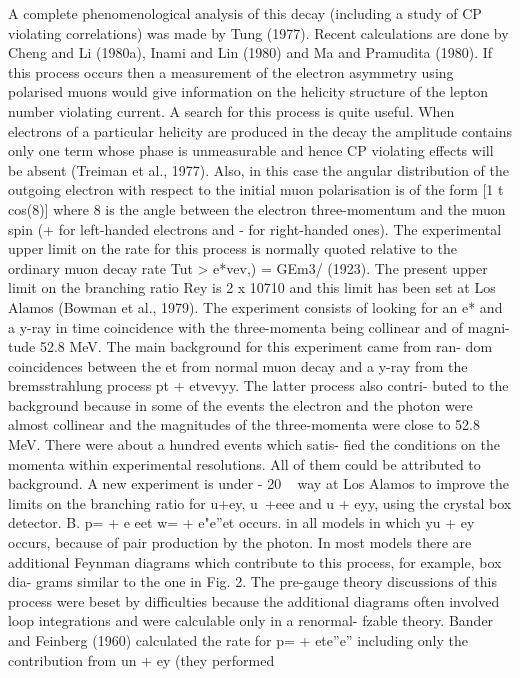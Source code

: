 \documentclass[twoside]{article}
\begin{document}
{{{{{{A complete phenomenological analysis of this decay (including a study of
CP violating correlations) was made by Tung (1977). Recent calculations
are done by Cheng and Li (1980a), Inami and Lin (1980) and Ma and
Pramudita (1980). If this process occurs then a measurement of the
electron asymmetry using polarised muons would give information on the
helicity structure of the lepton number violating current. A search for
this process is quite useful. When electrons of a particular helicity
are produced in the decay the amplitude contains only one term whose
phase is unmeasurable and hence CP violating effects will be absent
(Treiman et al., 1977). Also, in this case the angular distribution of
the outgoing electron with respect to the initial muon polarisation is
of the form [1 t cos(8)] where 8 is the angle between the electron
three-momentum and the muon spin (+ for left-handed electrons and - for
right-handed ones). The experimental upper limit on the rate for this
process is normally quoted relative to the ordinary muon decay rate
Tut > e*vev,) = GEm3/ (1923). The present upper limit on the branching
ratio Rey is 2 x 10710 and this limit has been set at Los Alamos (Bowman
et al., 1979). The experiment consists of looking for an e* and a y-ray
in time coincidence with the three-momenta being collinear and of magni-
tude 52.8 MeV. The main background for this experiment came from ran-
dom coincidences between the et from normal muon decay and a y-ray from
the bremsstrahlung process pt + etvevyy. The latter process also contri-
buted to the background because in some of the events the electron and
the photon were almost collinear and the magnitudes of the three-momenta
were close to 52.8 MeV. There were about a hundred events which satis-
fied the conditions on the momenta within experimental resolutions. All
of them could be attributed to background. A new experiment is under
- 20 ~
way at Los Alamos to improve the limits on the branching ratio for
u+ey, u~+eee and u + eyy, using the crystal box detector.
B. p= + e eet
w= + e"e”et occurs. in all models in which yu + ey occurs, because of
pair production by the photon. In most models there are additional
Feynman diagrams which contribute to this process, for example, box dia-
grams similar to the one in Fig. 2. The pre-gauge theory discussions of
this process were beset by difficulties because the additional diagrams
often involved loop integrations and were calculable only in a renormal-
fzable theory. Bander and Feinberg (1960) calculated the rate for
p= + ete”e” including only the contribution from un + ey (they performed
}}}}}}
\end{document}
